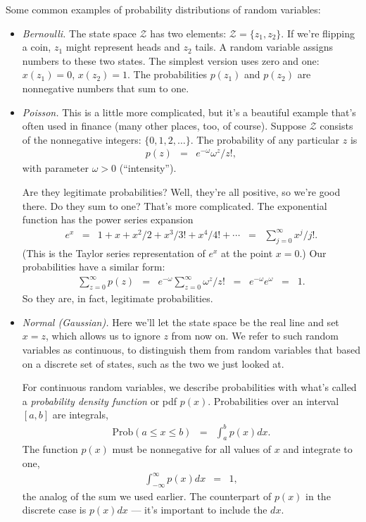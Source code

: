 Some common examples of probability distributions of random variables:
%
\begin{itemize}
\item {\it Bernoulli.\/}
The state space $\mathcal{Z}$ has two elements:  $\mathcal{Z} = \{z_1, z_2\}$.
If we're flipping a coin, $z_1$ might represent heads and $z_2$ tails.
A random variable assigns numbers to these two states.
The simplest version uses zero and one:
$x(z_1) = 0$, $x(z_2) = 1$.
The probabilities $p(z_1)$ and $p(z_2)$ are nonnegative numbers that sum to one.


\item {\it Poisson.\/}
This is a little more complicated, but it's a beautiful example
that's often used in finance (many other places, too, of course).
Suppose $\mathcal{Z}$ consists of the nonnegative integers:  $\{ 0, 1, 2, \ldots \}$.
The probability of any particular $z$ is
\begin{eqnarray*}
    p(z) &=& e^{-\omega} \omega^z/z! ,
\end{eqnarray*}
with parameter $\omega > 0$ (``intensity'').


Are they legitimate probabilities?
Well, they're all positive, so we're good there.
Do they sum to one?
That's more complicated.
The exponential function has the power series expansion
\begin{eqnarray}
    e^x &=& 1 + x + x^2/2 + x^3/3! + x^4/4! + \cdots
            \;\;=\;\; \sum_{j=0}^\infty x^j/j!.
    \label{eq:eofx-powerseries}
\end{eqnarray}
(This is the Taylor series representation of $e^x$ at the point $x=0$.)
Our probabilities have  a similar form:
\begin{eqnarray*}
    \sum_{z=0}^\infty p(z) &=& e^{-\omega} \sum_{z=0}^\infty \omega^z/z!
                \;\;=\;\; e^{-\omega} e^{\omega}
                \;\;=\;\; 1.
\end{eqnarray*}
So they are, in fact, legitimate probabilities. %

\item {\it Normal (Gaussian).\/}
Here we'll let the state space be the real line
and set $x=z$, which allows us to ignore $z$ from now on.
We refer to such random variables as continuous,
to distinguish them from random variables that
based on a discrete set of states, such as the two we just looked at.

For continuous random variables,
we describe probabilities
with what's called a {\it probability density function\/} or pdf $p(x)$.
Probabilities over an interval $[a,b]$ are integrals,
\begin{eqnarray*}
    \mbox{Prob} ( a\leq x \leq b ) &=& \int_{a}^b p(x) dx .
\end{eqnarray*}
The function $p(x)$ must be nonnegative for all values of $x$
and integrate to one,
\begin{eqnarray*}
    \int_{-\infty}^\infty p(x) dx &=& 1 ,
\end{eqnarray*}
the analog of the sum we used earlier.
The counterpart of $p(x)$ in the discrete case is $p(x) dx$
--- it's important to include the $dx$.


\end{itemize}
